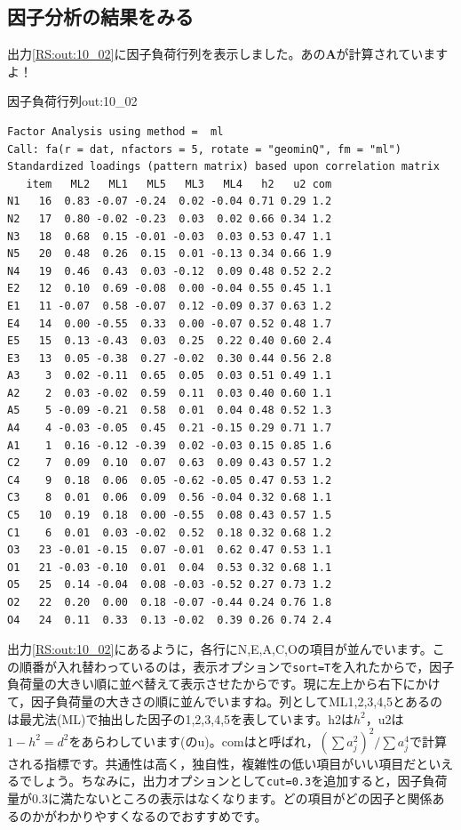 \documentclass{ltjsbook}
\begin{document}
\subsection{因子分析の結果をみる}
出力\ref{RS:out:10_02}に因子負荷行列を表示しました。あの$\bm{A}$が計算されていますよ！

\begin{Rscreen}{因子負荷行列}{out:10_02}
	\begin{verbatim}
Factor Analysis using method =  ml
Call: fa(r = dat, nfactors = 5, rotate = "geominQ", fm = "ml")
Standardized loadings (pattern matrix) based upon correlation matrix
   item   ML2   ML1   ML5   ML3   ML4   h2   u2 com
N1   16  0.83 -0.07 -0.24  0.02 -0.04 0.71 0.29 1.2
N2   17  0.80 -0.02 -0.23  0.03  0.02 0.66 0.34 1.2
N3   18  0.68  0.15 -0.01 -0.03  0.03 0.53 0.47 1.1
N5   20  0.48  0.26  0.15  0.01 -0.13 0.34 0.66 1.9
N4   19  0.46  0.43  0.03 -0.12  0.09 0.48 0.52 2.2
E2   12  0.10  0.69 -0.08  0.00 -0.04 0.55 0.45 1.1
E1   11 -0.07  0.58 -0.07  0.12 -0.09 0.37 0.63 1.2
E4   14  0.00 -0.55  0.33  0.00 -0.07 0.52 0.48 1.7
E5   15  0.13 -0.43  0.03  0.25  0.22 0.40 0.60 2.4
E3   13  0.05 -0.38  0.27 -0.02  0.30 0.44 0.56 2.8
A3    3  0.02 -0.11  0.65  0.05  0.03 0.51 0.49 1.1
A2    2  0.03 -0.02  0.59  0.11  0.03 0.40 0.60 1.1
A5    5 -0.09 -0.21  0.58  0.01  0.04 0.48 0.52 1.3
A4    4 -0.03 -0.05  0.45  0.21 -0.15 0.29 0.71 1.7
A1    1  0.16 -0.12 -0.39  0.02 -0.03 0.15 0.85 1.6
C2    7  0.09  0.10  0.07  0.63  0.09 0.43 0.57 1.2
C4    9  0.18  0.06  0.05 -0.62 -0.05 0.47 0.53 1.2
C3    8  0.01  0.06  0.09  0.56 -0.04 0.32 0.68 1.1
C5   10  0.19  0.18  0.00 -0.55  0.08 0.43 0.57 1.5
C1    6  0.01  0.03 -0.02  0.52  0.18 0.32 0.68 1.2
O3   23 -0.01 -0.15  0.07 -0.01  0.62 0.47 0.53 1.1
O1   21 -0.03 -0.10  0.01  0.04  0.53 0.32 0.68 1.1
O5   25  0.14 -0.04  0.08 -0.03 -0.52 0.27 0.73 1.2
O2   22  0.20  0.00  0.18 -0.07 -0.44 0.24 0.76 1.8
O4   24  0.11  0.33  0.13 -0.02  0.39 0.26 0.74 2.4
\end{verbatim}
\end{Rscreen}
出力\ref{RS:out:10_02}にあるように，各行にN,E,A,C,Oの項目が並んでいます。この順番が入れ替わっているのは，表示オプションで\verb|sort=T|を入れたからで，因子負荷量の大きい順に並べ替えて表示させたからです。現に左上から右下にかけて，因子負荷量の大きさの順に並んでいますね。列としてML1,2,3,4,5とあるのは最尤法(ML)で抽出した因子の1,2,3,4,5を表しています。h2は$h^2$，u2は$1-h^2=d^2$をあらわしています(のu)。comはと呼ばれ，$(\sum a_j^2)^2/\sum a_j^4$で計算される指標です。共通性は高く，独自性，複雑性の低い項目がいい項目だといえるでしょう。ちなみに，出力オプションとして\verb|cut=0.3|を追加すると，因子負荷量が0.3に満たないところの表示はなくなります。どの項目がどの因子と関係あるのかがわかりやすくなるのでおすすめです。
\end{document}
